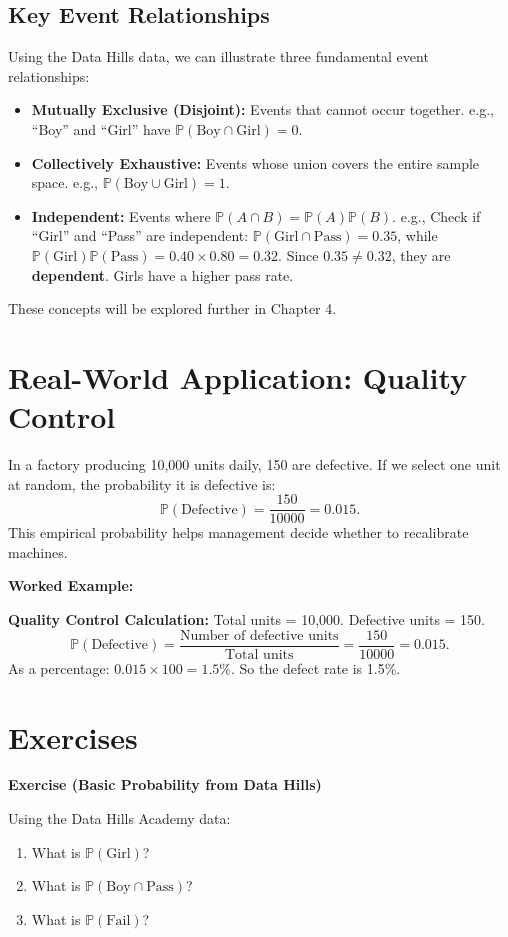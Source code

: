 \documentclass[12pt,a4paper,oneside]{report}
\theoremstyle{mytheorem}
\theoremstyle{mydefinition}
\theoremstyle{myremark}
\newenvironment{exercise}[1]{%
  \par\medskip\noindent\textbf{\color{myblue}Exercise (#1)}\par\smallskip
}{%
  \par\smallskip
}
\newenvironment{worked}{%
  \par\medskip\noindent\textbf{\color{myorange}Worked Example:}\par\smallskip
}{%
  \par\medskip
}
\newcommand{\Prob}{\mathbb{P}}
\begin{document}
\subsection*{Key Event Relationships}
Using the Data Hills data, we can illustrate three fundamental event relationships:

\begin{itemize}
    \item \textbf{Mutually Exclusive (Disjoint):} Events that cannot occur together.  
    e.g., “Boy” and “Girl” have $\Prob(\text{Boy} \cap \text{Girl}) = 0$.
    \item \textbf{Collectively Exhaustive:} Events whose union covers the entire sample space.  
    e.g., $\Prob(\text{Boy} \cup \text{Girl}) = 1$.
    \item \textbf{Independent:} Events where $\Prob(A \cap B) = \Prob(A)\Prob(B)$.  
    e.g., Check if “Girl” and “Pass” are independent:  
    $\Prob(\text{Girl} \cap \text{Pass}) = 0.35$, while $\Prob(\text{Girl})\Prob(\text{Pass}) = 0.40 \times 0.80 = 0.32$.  
    Since $0.35 \neq 0.32$, they are \textbf{dependent}. Girls have a higher pass rate.
\end{itemize}

These concepts will be explored further in Chapter 4.

\section{Real-World Application: Quality Control}
In a factory producing 10,000 units daily, 150 are defective. If we select one unit at random, the probability it is defective is:
\[
\Prob(\text{Defective}) = \frac{150}{10000} = 0.015.
\]
This empirical probability helps management decide whether to recalibrate machines.

\begin{worked}
\textbf{Quality Control Calculation:}
Total units = 10,000. Defective units = 150.
\[
\Prob(\text{Defective}) = \frac{\text{Number of defective units}}{\text{Total units}} = \frac{150}{10000} = 0.015.
\]
As a percentage: $0.015 \times 100 = 1.5\%$. So the defect rate is 1.5\%.
\end{worked}

\section{Exercises}
\begin{exercise}{Basic Probability from Data Hills}
Using the Data Hills Academy data:
\begin{enumerate}[label=(\alph*)]
    \item What is $\Prob(\text{Girl})$?
    \item What is $\Prob(\text{Boy} \cap \text{Pass})$?
    \item What is $\Prob(\text{Fail})$?
\end{enumerate}
\end{exercise}
\end{document}
